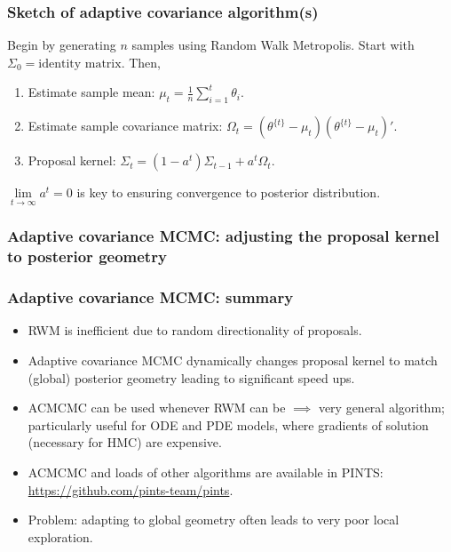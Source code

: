 \documentclass[handout]{beamer}
\begin{document}
\begin{frame}
	\frametitle{Sketch of adaptive covariance algorithm(s)}
	
	Begin by generating $n$ samples using Random Walk Metropolis. Start with $\Sigma_0 = \text{identity matrix}$. Then,
	
	\begin{enumerate}
		\item Estimate sample mean: $\mu_t = \frac{1}{n}\sum_{i=1}^{t} \theta_i$.
		\item Estimate sample covariance matrix: $\Omega_t =  (\theta^{\{t\}}-\mu_t) (\theta^{\{t\}}-\mu_t)'$.
		\item Proposal kernel: $\Sigma_t = (1-a^t) \Sigma_{t-1} + a^t \Omega_t$.
	\end{enumerate}
	
	$\lim\limits_{t\rightarrow\infty} a^t = 0$ is key to ensuring convergence to posterior distribution.
	
\end{frame}

\begin{frame}
	\frametitle{Adaptive covariance MCMC: adjusting the proposal kernel to posterior geometry}
	
	\begin{figure}[t]
		\centerline{}
	\end{figure}
	
\end{frame}

\begin{frame}
	\frametitle{Adaptive covariance MCMC: summary}
	
	\begin{itemize}
		\item RWM is inefficient due to random directionality of proposals.
		\item Adaptive covariance MCMC dynamically changes proposal kernel to match (global) posterior geometry leading to significant speed ups.
		\item ACMCMC can be used whenever RWM can be $\implies$ very general algorithm; particularly useful for ODE and PDE models, where gradients of solution (necessary for HMC) are expensive.
		\item ACMCMC and loads of other algorithms are available in PINTS: \url{https://github.com/pints-team/pints}.
		\item Problem: adapting to global geometry often leads to very poor local exploration.
	\end{itemize}
	
\end{frame}
\end{document}
